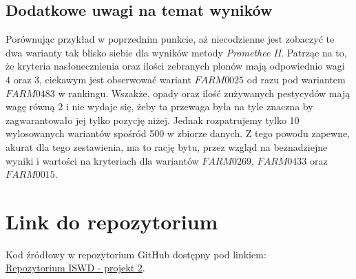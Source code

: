 \documentclass[11pt]{article}
\begin{document}
\subsection{Dodatkowe uwagi na temat wyników}
Porównując przykład w poprzednim punkcie, aż niecodzienne jest zobaczyć te dwa warianty tak blisko siebie dla wyników metody \textit{Promethee II}. Patrząc na to, że kryteria nasłonecznienia oraz ilości zebranych plonów mają odpowiednio wagi $4$ oraz $3$, ciekawym jest obserwować wariant $FARM0025$ od razu pod wariantem $FARM0483$ w rankingu. Wszakże, opady oraz ilość zużywanych pestycydów mają wagę równą $2$ i nie wydaje się, żeby ta przewaga była na tyle znaczna by zagwarantowało jej tylko pozycję niżej. Jednak rozpatrujemy tylko 10 wylosowanych wariantów spośród 500 w zbiorze danych. Z tego powodu zapewne, akurat dla tego zestawienia, ma to rację bytu, przez wzgląd na beznadziejne wyniki i wartości na kryteriach dla wariantów $FARM0269$, $FARM0433$ oraz $FARM0015$.

\section{Link do repozytorium}\label{sec:link-do-repo}
Kod źródłowy w repozytorium GitHub dostępny pod linkiem: \\
\href{https://github.com/KotZPolibudy/PUT_ISWD/tree/main/projekt2}{Repozytorium ISWD - projekt 2}.
\end{document}
